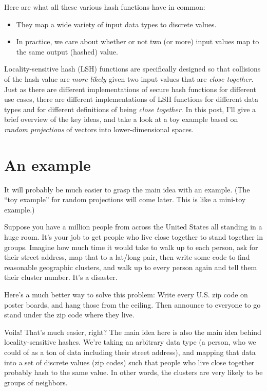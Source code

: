 \documentclass[20pt,]{extarticle}
\providecommand{\tightlist}{%
  \setlength{\itemsep}{0pt}\setlength{\parskip}{0pt}}
\begin{document}
Here are what all these various hash functions have in common:

\begin{itemize}
\tightlist
\item
  They map a wide variety of input data types to discrete values.
\item
  In practice, we care about whether or not two (or more) input values
  map to the same output (hashed) value.
\end{itemize}

Locality-sensitive hash (LSH) functions are specifically designed so
that collisions of the hash value are \emph{more likely} given two input
values that are \emph{close together}. Just as there are different
implementations of secure hash functions for different use cases, there
are different implementations of LSH functions for different data types
and for different definitions of being \emph{close together}. In this
post, I'll give a brief overview of the key ideas, and take a look at a
toy example based on \emph{random projections} of vectors into
lower-dimensional spaces.

\section{An example}\label{an-example}

It will probably be much easier to grasp the main idea with an example.
(The ``toy example'' for random projections will come later. This is
like a mini-toy example.)

Suppose you have a million people from across the United States all
standing in a huge room. It's your job to get people who live close
together to stand together in groups. Imagine how much time it would
take to walk up to each person, ask for their street address, map that
to a lat/long pair, then write some code to find reasonable geographic
clusters, and walk up to every person again and tell them their cluster
number. It's a disaster.

Here's a much better way to solve this problem: Write every U.S. zip
code on poster boards, and hang those from the ceiling. Then announce to
everyone to go stand under the zip code where they live.

Voila! That's much easier, right? The main idea here is also the main
idea behind locality-sensitive hashes. We're taking an arbitrary data
type (a person, who we could of as a ton of data including their street
address), and mapping that data into a set of discrete values (zip
codes) such that people who live close together probably hash to the
same value. In other words, the clusters are very likely to be groups of
neighbors.
\end{document}
